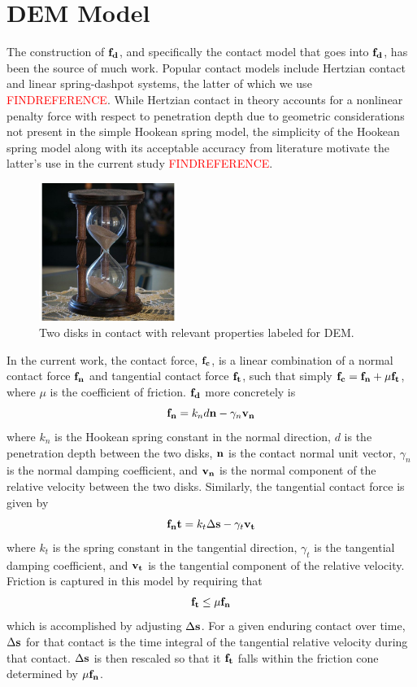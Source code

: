 \section{DEM Model} \label{DEM_Model}
The construction of $\bold{f_d}$, and specifically the contact model that goes into $\bold{f_d}$, has been the source of much work. Popular contact models include Hertzian contact and linear spring-dashpot systems, the latter of which we use \textcolor{red}{FINDREFERENCE}. While Hertzian contact in theory accounts for a nonlinear penalty force with respect to penetration depth due to geometric considerations not present in the simple Hookean spring model, the simplicity of the Hookean spring model along with its acceptable accuracy from literature motivate the latter's use in the current study \textcolor{red}{FINDREFERENCE}. 

\begin{figure}[htp] 
    \centering
    \includegraphics[width=0.4\textwidth]{figs/hourglass_whole.jpg}
    \caption{Two disks in contact with relevant properties labeled for DEM.}
    \label{DEM_diagram}
\end{figure}

In the current work, the contact force, $\bold{f_c}$, is a linear combination of a normal contact force $\bold{f_n}$ and tangential contact force $\bold{f_t}$, such that simply $\bold{f_c} = \bold{f_n} + \mu\bold{f_t}$, where $\mu$ is the coefficient of friction. $\bold{f_d}$ more concretely is
$$\bold{f_n}=k_nd\bold{n}-\gamma_n\bold{v_n}$$
where $k_n$ is the Hookean spring constant in the normal direction, $d$ is the penetration depth between the two disks, $\bold{n}$ is the contact normal unit vector, $\gamma_n$ is the normal damping coefficient, and $\bold{v_n}$ is the normal component of the relative velocity between the two disks. Similarly, the tangential contact force is given by
$$\bold{f_nt}=k_t\Delta\bold{s}-\gamma_t\bold{v_t}$$
where $k_t$ is the spring constant in the tangential direction, $\gamma_t$ is the tangential damping coefficient, and $\bold{v_t}$ is the tangential component of the relative velocity. Friction is captured in this model by requiring that
$$\bold{f_t}\leq\mu\bold{f_n}$$
which is accomplished by adjusting $\Delta\bold{s}$. For a given enduring contact over time, $\Delta\bold{s}$ for that contact is the time integral of the tangential relative velocity during that contact. $\Delta\bold{s}$ is then rescaled so that it $\bold{f_t}$ falls within the friction cone determined by $\mu\bold{f_n}$.

